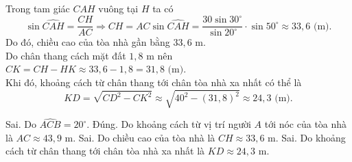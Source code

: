 \begin{ex}
{Trong tam giác $CAH$ vuông tại $H$ ta có
\[\sin \widehat{CAH} = \dfrac{CH}{AC} \Rightarrow CH = AC\sin \widehat{CAH} = \dfrac{30\sin 30^\circ}{\sin 20^\circ}\cdot \sin 50^\circ \approx 33{,}6 \text{ (m)}.\]
Do đó, chiều cao của tòa nhà gần bằng $33{,}6 \text{ m}$.\\
Do chân thang cách mặt đất $1{,}8 \text{ m}$ nên $CK=CH-HK \approx 33{,}6-1{,}8=31{,}8 \text{ (m)}$.\\
Khi đó, khoảng cách từ chân thang tới chân tòa nhà xa nhất có thể là
\[KD = \sqrt{CD^2-CK^2} \approx \sqrt{40^2-(31{,}8)^2} \approx 24{,}3 \text{ (m)}.\]
\begin{itemchoice}
\itemch Sai. Do $\widehat{ACB} = 20^\circ$.
\itemch Đúng. Do khoảng cách từ vị trí người $A$ tới nóc của tòa nhà là $AC \approx 43{,}9 \text{ m}$.
\itemch Sai. Do chiều cao của tòa nhà là $CH\approx 33{,}6 \text{ m}$.
\itemch Sai. Do khoảng cách từ chân thang tới chân tòa nhà xa nhất là $KD \approx 24{,}3 \text{ m}$.
\end{itemchoice}
}
\end{ex}

